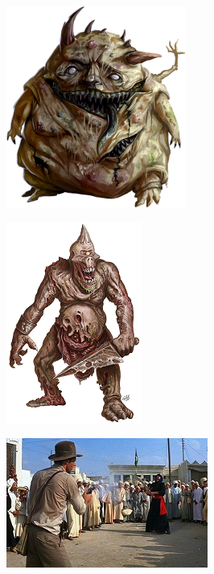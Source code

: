 \begin{figure}
	\begin{center}
		\includegraphics[width=\figwidth]{pics/6/25.png}
	\end{center}
\end{figure}

\begin{figure}
	\begin{center}
		\includegraphics[width=\figwidth]{pics/6/26.png}
	\end{center}
\end{figure}

\begin{figure}
	\begin{center}
		\includegraphics[width=\figwidth]{pics/6/27.png}
	\end{center}
\end{figure}

